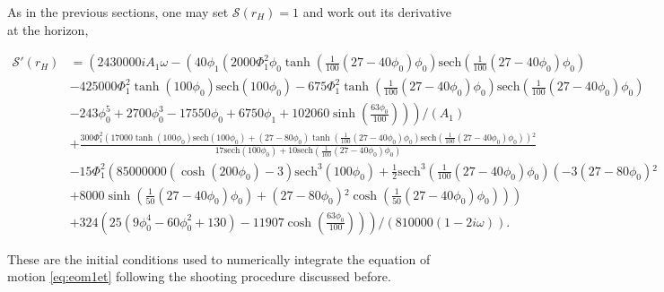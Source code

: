 \documentclass[aps,prd,showkeys,superscriptaddress,singlecolumn,nofootinbib,floatfix]{revtex4-1}
\begin{document}
As in the previous sections, one may set $\mathcal{S}(r_H)=1$ and work out its derivative at the horizon,
\begin{widetext}
\begin{align}
\mathcal{S}'(r_H) &= \left(2430000 i A_1 \omega -\left( 40 \phi _1 \left(2000 \Phi _1^2 \phi _0 \tanh \left(\frac{1}{100} \left(27-40 \phi _0\right) \phi _0\right) \text{sech}\left(\frac{1}{100}
   \left(27-40 \phi _0\right) \phi _0\right)\right.\right.\right.\nonumber\\
& -425000 \Phi _1^2 \tanh \left(100 \phi _0\right) \text{sech}\left(100 \phi _0\right)-675 \Phi _1^2 \tanh \left(\frac{1}{100}
   \left(27-40 \phi _0\right) \phi _0\right) \text{sech}\left(\frac{1}{100} \left(27-40 \phi _0\right) \phi _0\right)\nonumber\\
&\left.\left. -243 \phi _0^5+2700 \phi _0^3-17550 \phi _0+6750 \phi
   _1+102060 \sinh \left(\frac{63 \phi _0}{100}\right)\right)\right) / (A_1)\nonumber\\
& +\frac{300 \Phi _1^2 \left(17000 \tanh \left(100 \phi _0\right) \text{sech}\left(100 \phi _0\right)+\left(27-80
   \phi _0\right) \tanh \left(\frac{1}{100} \left(27-40 \phi _0\right) \phi _0\right) \text{sech}\left(\frac{1}{100} \left(27-40 \phi _0\right) \phi _0\right)\right){}^2}{17
   \text{sech}\left(100 \phi _0\right)+10 \text{sech}\left(\frac{1}{100} \left(27-40 \phi _0\right) \phi _0\right)}\nonumber\\
& -15 \Phi _1^2 \left(85000000 \left(\cosh \left(200 \phi
   _0\right)-3\right) \text{sech}^3\left(100 \phi _0\right)+\frac{1}{2} \text{sech}^3\left(\frac{1}{100} \left(27-40 \phi _0\right) \phi _0\right) \left(-3 \left(27-80 \phi
   _0\right){}^2\right.\right.\nonumber\\
&\left.\left. +8000 \sinh \left(\frac{1}{50} \left(27-40 \phi _0\right) \phi _0\right)+\left(27-80 \phi _0\right){}^2 \cosh \left(\frac{1}{50} \left(27-40 \phi _0\right) \phi
   _0\right)\right)\right)\nonumber\\
&\left. +324 \left(25 \left(9 \phi _0^4-60 \phi _0^2+130\right)-11907 \cosh \left(\frac{63 \phi _0}{100}\right)\right)\right) / \left(810000 (1-2 i \omega )\right).
\label{eq:S1num}
\end{align}
\end{widetext}
These are the initial conditions used to numerically integrate the equation of motion \eqref{eq:eom1et} following the shooting procedure discussed before.
\end{document}
